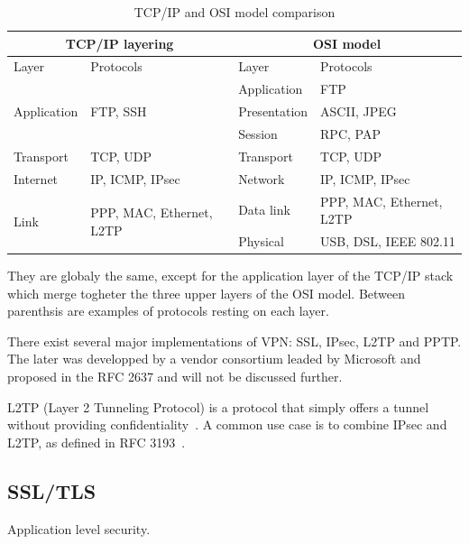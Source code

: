 \begin{table}[ht]
\center
\begin{tabularx}{\textwidth}{|l|l|l|X|} \hline
\multicolumn{2}{|c|}{TCP/IP layering} & \multicolumn{2}{c|}{OSI model} \\ \hline
Layer & Protocols & Layer & Protocols \\ \hline
\multirow{3}{*}{Application} & \multirow{3}{*}{FTP, SSH} & Application & FTP \\ \cline{3-4}
 & & Presentation & ASCII, JPEG \\ \cline{3-4}
 & & Session & RPC, PAP \\ \hline
Transport & TCP, UDP & Transport & TCP, UDP \\ \hline
Internet & IP, ICMP, IPsec & Network & IP, ICMP, IPsec \\ \hline
\multirow{2}{*}{Link} & \multirow{2}{*}{PPP, MAC, Ethernet, L2TP} & Data link & PPP, MAC, Ethernet, L2TP \\ \cline{3-4}
 & & Physical & USB, DSL, IEEE 802.11 \\ \hline
\end{tabularx}
\caption{TCP/IP and OSI model comparison}{They are globaly the same, except for the application layer of the TCP/IP stack which merge togheter the three upper layers of the OSI model. Between parenthsis are examples of protocols resting on each layer.}
\label{tab:tcp-ip-stack}
\end{table}



There exist several major implementations of VPN: SSL, IPsec, L2TP and PPTP.
The later was developped by a vendor consortium leaded by Microsoft and proposed in the RFC 2637 and will not be discussed further.

\noindent L2TP (Layer 2 Tunneling Protocol) is a protocol that simply offers a tunnel without providing confidentiality~\cite{rfc3931}.
A common use case is to combine IPsec and L2TP, as defined in RFC 3193~\cite{rfc3193}.

\subsection{SSL/TLS}
Application level security.














